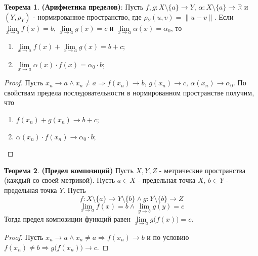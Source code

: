 \documentclass[12pt]{article}
\newcommand{\MR}{\mathbb{R}}
\theoremstyle{definition}
\newtheorem{theorem}{Теорема}
\begin{document}
\begin{theorem}
	\textbf{(Арифметика пределов)}: Пусть $f,g\colon X \setminus \{a\} \to Y, \, \alpha \colon X \setminus \{a\} \to \MR$ и $(Y, \rho_Y)$ - нормированное пространство, где $\rho_Y(u,v) = \|u - v\|$. Если $\lim\limits_{x \to a}f(x) = b, \, \lim\limits_{x \to a}g(x) = c$ и $\lim\limits_{x \to a}\alpha(x) = \alpha_0$, то
	\begin{enumerate}[label ={(\arabic*)}]
		\item $\lim\limits_{x \to a}f(x) + \lim\limits_{x \to a}g(x) = b + c$;
		\item $\lim\limits_{x \to a}\alpha(x){\cdot}f(x) = \alpha_0{\cdot}b$;
	\end{enumerate}
\end{theorem}
\begin{proof}
	Пусть $x_n \to a \wedge x_n \neq a \Rightarrow f(x_n) \to b, \, g(x_n) \to c, \, \alpha(x_n) \to \alpha_0$. По свойствам предела последовательности в нормированном пространстве получим, что
	\begin{enumerate}[label ={(\arabic*)}]
		\item $f(x_n) + g(x_n) \to b + c$;
		\item $\alpha(x_n){\cdot}f(x_n) \to \alpha_0{\cdot}b$;
	\end{enumerate}
\end{proof}
\begin{theorem}
	\textbf{(Предел композиций)} Пусть $X,Y,Z$ - метрические пространства (каждый со своей метрикой). Пусть $a \in X$ - предельная точка $X$, $b \in Y$ - предельная точка $Y$. Пусть
	$$
		f \colon X \setminus \{a\} \to Y \setminus \{b\} \wedge g \colon Y \setminus \{b\} \to Z
	$$
	$$
		\lim\limits_{x \to a} f(x) = b \wedge \lim\limits_{y \to b} g(y) = c
	$$
	Тогда предел композиции функций равен $\lim\limits_{x \to a}g \big(f(x)\big) = c$.
\end{theorem}
\begin{proof}
	Пусть $x_n \to a \wedge x_n \neq a \Rightarrow f(x_n) \to b$ и по условию $f(x_n) \neq b \Rightarrow g\big(f(x_n)\big) \to c$.
\end{proof}
\end{document}
